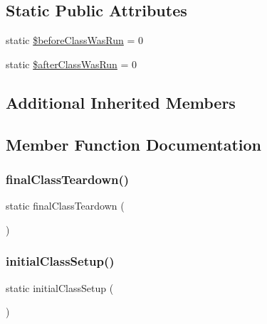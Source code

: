 \subsection*{Static Public Attributes}
\begin{DoxyCompactItemize}
\item 
static \mbox{\hyperlink{class_before_class_and_after_class_test_a4faedf112168c0be9ccc3926cbc47e1b}{\$before\+Class\+Was\+Run}} = 0
\item 
static \mbox{\hyperlink{class_before_class_and_after_class_test_a46cf5fb3e71df7ff80751333fd0a9cff}{\$after\+Class\+Was\+Run}} = 0
\end{DoxyCompactItemize}
\subsection*{Additional Inherited Members}


\subsection{Member Function Documentation}
\mbox{\label{class_before_class_and_after_class_test_a3bfb1b9495124cd44d8d965d905451eb}} 
\subsubsection{\texorpdfstring{final\+Class\+Teardown()}{finalClassTeardown()}}
{\footnotesize\ttfamily static final\+Class\+Teardown (\begin{DoxyParamCaption}{ }\end{DoxyParamCaption})\hspace{0.3cm}{\ttfamily [static]}}

\mbox{\label{class_before_class_and_after_class_test_aceb165ef388e619da526d8ad0049e90d}} 
\subsubsection{\texorpdfstring{initial\+Class\+Setup()}{initialClassSetup()}}
{\footnotesize\ttfamily static initial\+Class\+Setup (\begin{DoxyParamCaption}{ }\end{DoxyParamCaption})\hspace{0.3cm}{\ttfamily [static]}}

